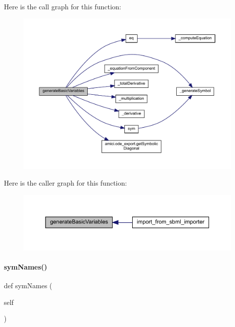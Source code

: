 Here is the call graph for this function\+:
\nopagebreak
\begin{figure}[H]
\begin{center}
\leavevmode
\includegraphics[width=350pt]{classamici_1_1ode__export_1_1_o_d_e_model_af3b774d51a546704413dc57f93dc427d_cgraph}
\end{center}
\end{figure}
Here is the caller graph for this function\+:
\nopagebreak
\begin{figure}[H]
\begin{center}
\leavevmode
\includegraphics[width=350pt]{classamici_1_1ode__export_1_1_o_d_e_model_af3b774d51a546704413dc57f93dc427d_icgraph}
\end{center}
\end{figure}
\mbox{\label{classamici_1_1ode__export_1_1_o_d_e_model_a2223bbe62f3234b8f40c5a566064a481}} 
\paragraph{\texorpdfstring{sym\+Names()}{symNames()}}
{\footnotesize\ttfamily def sym\+Names (\begin{DoxyParamCaption}\item[{}]{self }\end{DoxyParamCaption})}

